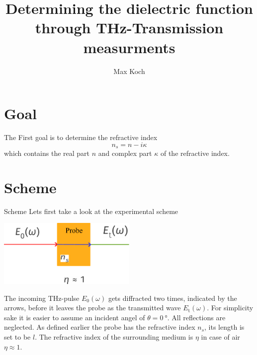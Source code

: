 \documentclass[aspectratio=1610, 9pt]{beamer}
\title{Determining the dielectric function through THz-Transmission measurments}
\author[M.~Koch]{Max Koch}
\institute[AG Wang]{Arbeitsgruppe Wang \\  Fakultät Physik}
\begin{document}
\maketitle

\section{Goal}
\begin{frame}
The First goal is to determine the refractive index 
\begin{equation}
  n_s = n - i\kappa
\end{equation}
which contains the real part $n$ and complex part $\kappa$ of the refractive index.
\end{frame}

\section{Scheme}
\begin{frame}{Scheme}
  Lets first take a look at the experimental scheme
  \begin{center}
  \includegraphics[width=0.5\textwidth]{images/Transmission.pdf}
  \end{center}
  The incoming THz-pulse $E_0(\omega)$ gets diffracted two times, indicated by the arrows, before it leaves the probe as the transmitted wave $E_\text{t}(\omega)$.
  For simplicity sake it is easier to assume an incident angel of $\theta=\SI{0}{\degree}$.
  All reflections are neglected.
  As defined earlier the probe has the refractive index $n_s$, its length is set to be $l$.
  The refractive index of the surrounding medium is $\eta$ in case of air $\eta\approx 1$.
\end{frame}
\end{document}
